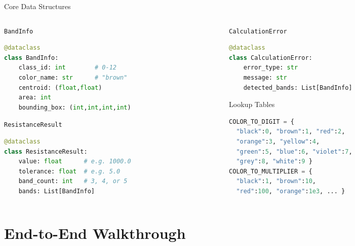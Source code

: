 \documentclass[aspectratio=169, 11pt]{beamer}
\begin{document}
\begin{frame}[fragile]{Core Data Structures}
\begin{columns}[T]
\begin{column}{0.48\textwidth}
\begin{block}{\texttt{BandInfo}}
\begin{lstlisting}[language=Python]
@dataclass
class BandInfo:
    class_id: int        # 0-12
    color_name: str      # "brown"
    centroid: (float,float)
    area: int
    bounding_box: (int,int,int,int)
\end{lstlisting}
\end{block}
\vspace{0.05cm}
\begin{block}{\texttt{ResistanceResult}}
\begin{lstlisting}[language=Python]
@dataclass
class ResistanceResult:
    value: float      # e.g. 1000.0
    tolerance: float  # e.g. 5.0
    band_count: int   # 3, 4, or 5
    bands: List[BandInfo]
\end{lstlisting}
\end{block}
\end{column}
\begin{column}{0.48\textwidth}
\begin{block}{\texttt{CalculationError}}
\begin{lstlisting}[language=Python]
@dataclass
class CalculationError:
    error_type: str
    message: str
    detected_bands: List[BandInfo]
\end{lstlisting}
\end{block}
\vspace{0.05cm}
\begin{block}{Lookup Tables}
\begin{lstlisting}[language=Python]
COLOR_TO_DIGIT = {
  "black":0, "brown":1, "red":2,
  "orange":3, "yellow":4,
  "green":5, "blue":6, "violet":7,
  "grey":8, "white":9 }
COLOR_TO_MULTIPLIER = {
  "black":1, "brown":10,
  "red":100, "orange":1e3, ... }
\end{lstlisting}
\end{block}
\end{column}
\end{columns}
\end{frame}

\section{End-to-End Walkthrough}
\end{document}
